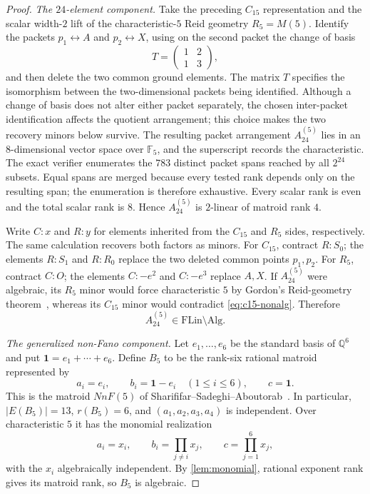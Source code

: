\documentclass[11pt]{article}
\theoremstyle{definition}
\newcommand{\FLin}{\mathrm{FLin}}
\newcommand{\Alg}{\mathrm{Alg}}
\begin{document}
\begin{proof}
\emph{The $24$-element component.}
Take the preceding $C_{15}$ representation and the scalar width-$2$ lift of the characteristic-$5$ Reid geometry $R_5=M(5)$.  Identify the packets $p_1\leftrightarrow A$ and $p_2\leftrightarrow X$, using on the second packet the change of basis
\[
T=\begin{pmatrix}1&2\\1&3\end{pmatrix},
\]
and then delete the two common ground elements.  The matrix $T$ specifies the isomorphism between the two-dimensional packets being identified.  Although a change of basis does not alter either packet separately, the chosen inter-packet identification affects the quotient arrangement; this choice makes the two recovery minors below survive.  The resulting packet arrangement $A_{24}^{(5)}$ lies in an $8$-dimensional vector space over $\mathbb F_5$, and the superscript records the characteristic.  The exact verifier enumerates the $783$ distinct packet spans reached by all $2^{24}$ subsets.  Equal spans are merged because every tested rank depends only on the resulting span; the enumeration is therefore exhaustive.  Every scalar rank is even and the total scalar rank is $8$.  Hence $A_{24}^{(5)}$ is $2$-linear of matroid rank $4$.

Write $C{:}x$ and $R{:}y$ for elements inherited from the $C_{15}$ and $R_5$ sides, respectively.  The same calculation recovers both factors as minors.  For $C_{15}$, contract $R:S_0$; the elements $R:S_1$ and $R:R_0$ replace the two deleted common points $p_1,p_2$.  For $R_5$, contract $C:O$; the elements $C:-e^2$ and $C:-e^3$ replace $A,X$.  If $A_{24}^{(5)}$ were algebraic, its $R_5$ minor would force characteristic $5$ by Gordon's Reid-geometry theorem~\cite{Gordon1988}, whereas its $C_{15}$ minor would contradict \eqref{eq:c15-nonalg}.  Therefore
\[
A_{24}^{(5)}\in\FLin\setminus\Alg.
\]

\emph{The generalized non-Fano component.}
Let $e_1,\ldots,e_6$ be the standard basis of $\mathbb Q^6$ and put $\mathbf 1=e_1+\cdots+e_6$.  Define $B_5$ to be the rank-six rational matroid represented by
\[
a_i=e_i,\qquad b_i=\mathbf 1-e_i\quad(1\le i\le6),
\qquad c=\mathbf 1.
\]
This is the matroid $NnF(5)$ of Sharififar--Sadeghi--Aboutorab~\cite[Definition~21]{SharififarEtAl2024}.  In particular, $|E(B_5)|=13$, $r(B_5)=6$, and $(a_1,a_2,a_3,a_4)$ is independent.  Over characteristic $5$ it has the monomial realization
\[
a_i=x_i,\qquad b_i=\prod_{j\ne i}x_j,
\qquad c=\prod_{j=1}^6x_j,
\]
with the $x_i$ algebraically independent.  By \cref{lem:monomial}, rational exponent rank gives its matroid rank, so $B_5$ is algebraic.


\end{proof}
\end{document}
